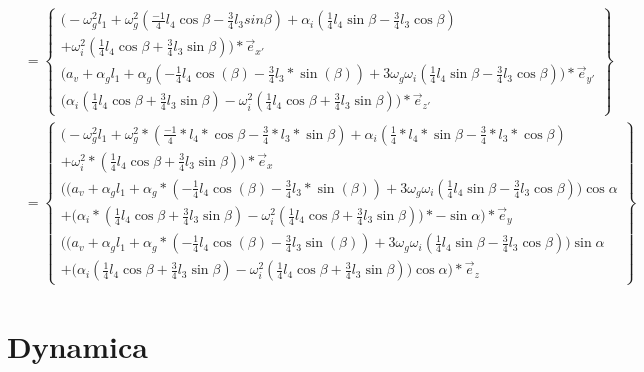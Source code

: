 \documentclass[a4paper,10pt]{article}
\begin{document}
\begin{equation}
\begin{aligned}
&=\begin{Bmatrix}
\Big( -\omega^{2}_g l_1 +\omega_{g}^{2}  (\frac{-1}{4} l_4 \cos{\beta}-\frac{3}{4} l_3 sin{\beta})+\alpha_i(\frac{1}{4} l_4 \sin{\beta}-\frac{3}{4} l_3 \cos{\beta})\\ + \omega_i^2 (\frac{1}{4} l_4 \cos{\beta} + \frac{3}{4} l_3  \sin{\beta}) \Big)* \vec{e}_{x'}\\
\Big(a_v +\alpha_g l_1 +\alpha_g ({-\frac{1}{4}} l_4 \cos(\beta)-\frac{3}{4}l_3*\sin(\beta)) + 3\omega_g\omega_i(\frac{1}{4}l_4 \sin{\beta}-\frac{3}{4}l_3  \cos{\beta})\Big)*\vec{e}_{y'}\\
\Big(\alpha_i (\frac{1}{4} l_4 \cos{\beta} + \frac{3}{4} l_3  \sin{\beta}) - \omega_i^2(\frac{1}{4} l_4 \cos{\beta} + \frac{3}{4} l_3  \sin{\beta})\Big)*\vec{e}_{z'}
\end{Bmatrix}\\
&= \begin{Bmatrix}
\Big( -\omega^{2}_g l_1 +\omega_{g}^{2} * (\frac{-1}{4}*l_4*\cos{\beta}-\frac{3}{4}*l_3*\sin{\beta})+\alpha_i(\frac{1}{4}*l_4 *\sin{\beta}-\frac{3}{4}*l_3 * \cos{\beta})\\ + \omega_i^2*(\frac{1}{4} l_4 \cos{\beta} + \frac{3}{4} l_3  \sin{\beta}) \Big)* \vec{e}_{x}\\
\Bigg(\Big(a_v +\alpha_g l_1 +\alpha_g *({-\frac{1}{4}}  l_4 \cos(\beta)-\frac{3}{4}l_3*\sin(\beta)) + 3\omega_g\omega_i(\frac{1}{4}l_4 \sin{\beta}-\frac{3}{4}l_3  \cos{\beta})\Big)\cos{\alpha}\\ + \Big(\alpha_i * (\frac{1}{4} l_4 \cos{\beta} + \frac{3}{4} l_3 \sin{\beta}) - \omega_i^2(\frac{1}{4} l_4 \cos{\beta} + \frac{3}{4} l_3  \sin{\beta})\Big)*-\sin{\alpha}\Bigg)*\vec{e}_{y}\\
\Bigg(\Big(a_v +\alpha_g l_1 +\alpha_g *({-\frac{1}{4}}  l_4 \cos(\beta)-\frac{3}{4}l_3 \sin(\beta)) + 3\omega_g\omega_i(\frac{1}{4}l_4 \sin{\beta}-\frac{3}{4}l_3  \cos{\beta})\Big)\sin{\alpha}\\ + \Big(\alpha_i (\frac{1}{4} l_4 \cos{\beta} + \frac{3}{4} l_3 \sin{\beta}) - \omega_i^2(\frac{1}{4} l_4 \cos{\beta} + \frac{3}{4} l_3  \sin{\beta})\Big) \cos{\alpha}\Bigg)*\vec{e}_{z}
\end{Bmatrix}
\end{aligned}
\end{equation}
\section{Dynamica}
\end{document}
